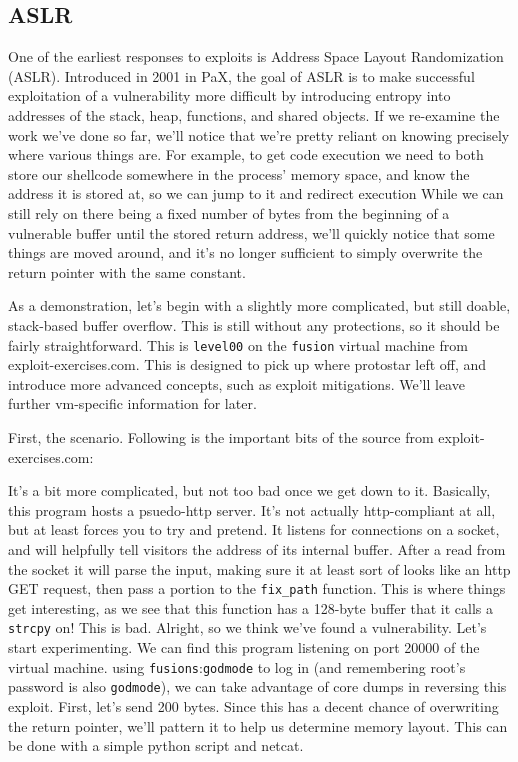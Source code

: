 \subsection{ASLR}

One of the earliest responses to exploits is Address Space Layout Randomization (ASLR).
Introduced in 2001 in PaX, the goal of ASLR is to make successful exploitation
of a vulnerability more difficult by introducing entropy into addresses
of the stack, heap, functions, and shared objects. If we re-examine
the work we've done so far, we'll notice that we're pretty reliant
on knowing precisely where various things are. For example, to get code
execution we need to both store our shellcode somewhere in the
process' memory space, and know the address it is stored at, so
we can jump to it and redirect execution While we can still
rely on there being a fixed number of bytes from the beginning of
a vulnerable buffer until the stored return address, we'll quickly
notice that some things are moved around, and it's no longer
sufficient to simply overwrite the return pointer with the same constant.

As a demonstration, let's begin with a slightly more complicated, but
still doable, stack-based buffer overflow. This is still without
any protections, so it should be fairly straightforward. This is
\texttt{level00} on the \texttt{fusion} virtual machine from exploit-exercises.com.
This is designed to pick up where protostar left off, and introduce
more advanced concepts, such as exploit mitigations. We'll leave
further vm-specific information for later.

First, the scenario. Following is the important bits of the source 
from exploit-exercises.com:



It's a bit more complicated, but not too bad once we get down to it.
Basically, this program hosts a psuedo-http server. It's not
actually http-compliant at all, but at least forces you to try
and pretend. It listens for connections on a socket, and will
helpfully tell visitors the address of its internal buffer.
After a read from the socket it will parse the input, making
sure it at least sort of looks like an http GET request, then
pass a portion to the \texttt{fix\_path} function. This is where 
things get interesting, as we see that this function
has a 128-byte buffer that it calls a \texttt{strcpy} on! This
is bad. Alright, so we think we've found a vulnerability. Let's 
start experimenting. We can find this program listening on
port 20000 of the virtual machine. using \texttt{fusions}:\texttt{godmode}
to log in (and remembering root's password is also \texttt{godmode}), we
can take advantage of core dumps in reversing this exploit.
First, let's send 200 bytes. Since this has a decent chance of 
overwriting the return pointer, we'll pattern it to help us 
determine memory layout. This can be done with a simple python script
and netcat.

